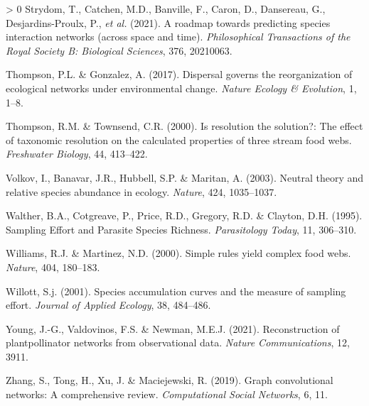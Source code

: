 \documentclass[11pt]{article}
\newlength{\cslhangindent}
\newenvironment{CSLReferences}[3] %
 {%
  \setlength{\parindent}{0pt}
  \ifodd #1 \everypar{\setlength{\hangindent}{\cslhangindent}}\ignorespaces\fi
  \ifnum #2 > 0
  \setlength{\parskip}{#2\baselineskip}
  \fi
 }%
 {}
\begin{document}
\begin{CSLReferences}{1}{0}
\leavevmode\hypertarget{ref-Strydom2021RoaPre}{}%
Strydom, T., Catchen, M.D., Banville, F., Caron, D., Dansereau, G.,
Desjardins-Proulx, P., \emph{et al.} (2021). A roadmap towards
predicting species interaction networks (across space and time).
\emph{Philosophical Transactions of the Royal Society B: Biological
Sciences}, 376, 20210063.

\leavevmode\hypertarget{ref-Thompson2017DisGov}{}%
Thompson, P.L. \& Gonzalez, A. (2017). Dispersal governs the
reorganization of ecological networks under environmental change.
\emph{Nature Ecology \& Evolution}, 1, 1--8.

\leavevmode\hypertarget{ref-Thompson2000ResSol}{}%
Thompson, R.M. \& Townsend, C.R. (2000). Is resolution the solution?:
The effect of taxonomic resolution on the calculated properties of three
stream food webs. \emph{Freshwater Biology}, 44, 413--422.

\leavevmode\hypertarget{ref-Volkov2003NeuThe}{}%
Volkov, I., Banavar, J.R., Hubbell, S.P. \& Maritan, A. (2003). Neutral
theory and relative species abundance in ecology. \emph{Nature}, 424,
1035--1037.

\leavevmode\hypertarget{ref-Walther1995SamEff}{}%
Walther, B.A., Cotgreave, P., Price, R.D., Gregory, R.D. \& Clayton,
D.H. (1995). Sampling Effort and Parasite Species Richness.
\emph{Parasitology Today}, 11, 306--310.

\leavevmode\hypertarget{ref-Williams2000SimRul}{}%
Williams, R.J. \& Martinez, N.D. (2000). Simple rules yield complex food
webs. \emph{Nature}, 404, 180--183.

\leavevmode\hypertarget{ref-Willott2001SpeAcc}{}%
Willott, S.j. (2001). Species accumulation curves and the measure of
sampling effort. \emph{Journal of Applied Ecology}, 38, 484--486.

\leavevmode\hypertarget{ref-Young2021RecPla}{}%
Young, J.-G., Valdovinos, F.S. \& Newman, M.E.J. (2021). Reconstruction
of plantpollinator networks from observational data. \emph{Nature
Communications}, 12, 3911.

\leavevmode\hypertarget{ref-Zhang2019GraCon}{}%
Zhang, S., Tong, H., Xu, J. \& Maciejewski, R. (2019). Graph
convolutional networks: A comprehensive review. \emph{Computational
Social Networks}, 6, 11.

\end{CSLReferences}
\end{document}
